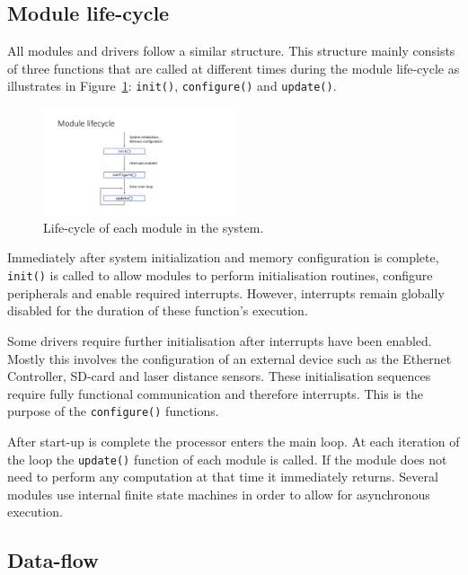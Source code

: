 \subsection{Module life-cycle}

All modules and drivers follow a similar structure. This structure mainly consists of three functions that are called at different times during the module life-cycle as illustrates in Figure~\ref{fig:module_lifecycle}: \texttt{init()}, \texttt{configure()} and \texttt{update()}.

\begin{figure}[H]
    \centering \includegraphics[width=0.5\textwidth]{./figures/module_lifecycle.pdf}
    \caption{Life-cycle of each module in the system.}
    \label{fig:module_lifecycle}
\end{figure}

Immediately after system initialization and memory configuration is complete, \texttt{init()} is called to allow modules to perform initialisation routines, configure peripherals and enable required interrupts. However, interrupts remain globally disabled for the duration of these function's execution.

Some drivers require further initialisation after interrupts have been enabled. Mostly this involves the configuration of an external device such as the Ethernet Controller, SD-card and laser distance sensors. These initialisation sequences require fully functional communication and therefore interrupts. This is the purpose of the \texttt{configure()} functions.

After start-up is complete the processor enters the main loop. At each iteration of the loop the \texttt{update()} function of each module is called. If the module does not need to perform any computation at that time it immediately returns. Several modules use internal finite state machines in order to allow for asynchronous execution.

\subsection{Data-flow}

